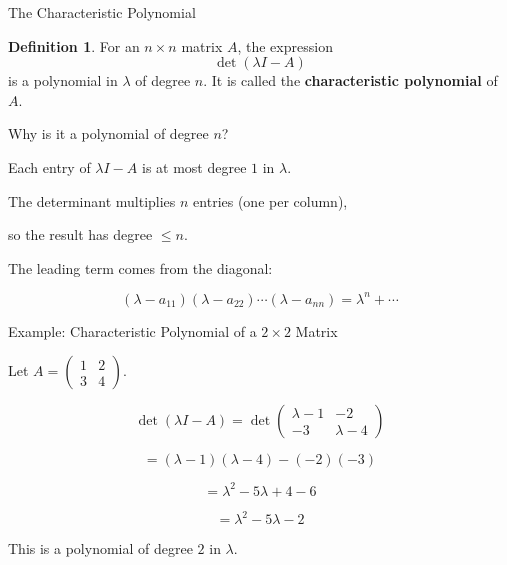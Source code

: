 \documentclass[10pt]{beamer}
\theoremstyle{definition}
\newtheorem{defi}{Definition}[section]
\newcommand{\x}[1]{\alert{\textbf{#1}}}
\begin{document}
\begin{frame}{The Characteristic Polynomial}

\begin{defi}
For an $n \times n$ matrix $A$, the expression
$$\det(\lambda I - A)$$
is a polynomial in $\lambda$ of degree $n$. It is called the \x{characteristic polynomial} of $A$.
\end{defi}

\vfill

Why is it a polynomial of degree $n$?

\vfill

Each entry of $\lambda I - A$ is at most degree $1$ in $\lambda$.

The determinant multiplies $n$ entries (one per column),

so the result has degree $\leq n$.

\vfill

The leading term comes from the diagonal:

$$(\lambda - a_{11})(\lambda - a_{22}) \cdots (\lambda - a_{nn}) = \lambda^n + \cdots$$

\vfill
\end{frame}


\begin{frame}{Example: Characteristic Polynomial of a $2 \times 2$ Matrix}

Let $A = \begin{pmatrix} 1 & 2 \\ 3 & 4 \end{pmatrix}$.

\vfill

$$\det(\lambda I - A) = \det \begin{pmatrix} \lambda - 1 & -2 \\ -3 & \lambda - 4 \end{pmatrix}$$

\vfill

$$= (\lambda - 1)(\lambda - 4) - (-2)(-3)$$

\vfill

$$= \lambda^2 - 5\lambda + 4 - 6$$

\vfill

$$= \lambda^2 - 5\lambda - 2$$

\vfill

This is a polynomial of degree $2$ in $\lambda$.
\vfill
\end{frame}
\end{document}

